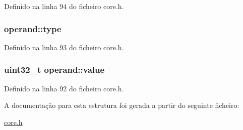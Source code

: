 Definido na linha 94 do ficheiro core.\-h.

\hypertarget{structoperand_a8af3746223d14253f5b287d236f59ce4}{
\subsubsection[{type}]{ operand\-::type}}\label{structoperand_a8af3746223d14253f5b287d236f59ce4}


Definido na linha 93 do ficheiro core.\-h.

\hypertarget{structoperand_a4112f16b41c272f45499c809391b17a2}{
\subsubsection[{value}]{\setlength{\rightskip}{0pt plus 5cm}uint32\-\_\-t operand\-::value}}\label{structoperand_a4112f16b41c272f45499c809391b17a2}


Definido na linha 92 do ficheiro core.\-h.



A documentação para esta estrutura foi gerada a partir do seguinte ficheiro\-:\begin{DoxyCompactItemize}
\item 
\hyperlink{core_8h}{core.\-h}\end{DoxyCompactItemize}
